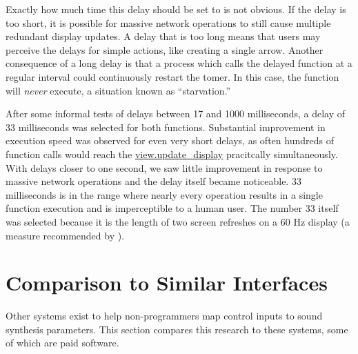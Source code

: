 
Exactly how much time this delay should be set to is not obvious. If the delay is too short, it is possible for massive network operations to still cause multiple redundant display updates. A delay that is too long means that users may perceive the delays for simple actions, like creating a single arrow. Another consequence of a long delay is that a process which calls the delayed function at a regular interval could continuously restart the tomer. In this case, the function will \emph{never} execute, a situation known as ``starvation.''

After some informal tests of delays between 17 and 1000 milliseconds, a delay of 33 milliseconds was selected for both functions. Substantial improvement in execution speed was observed for even very short delays, as often hundreds of function calls would reach the \url{view.update_display} pracitcally simultaneously. With delays closer to one second, we saw little improvement in response to massive network operations and the delay itself became noticeable. 33 milliseconds is in the range where nearly every operation results in a single function execution and is imperceptible to a human user. The number 33 itself was selected because it is the length of two screen refreshes on a 60 Hz display (a measure recommended by ).
	


\section{Comparison to Similar Interfaces} %
\label{sec:comparison_to_similar_interfaces}

Other systems exist to help non-programmers map control inputs to sound synthesis parameters. This section compares this research to these systems, some of which are paid software.


